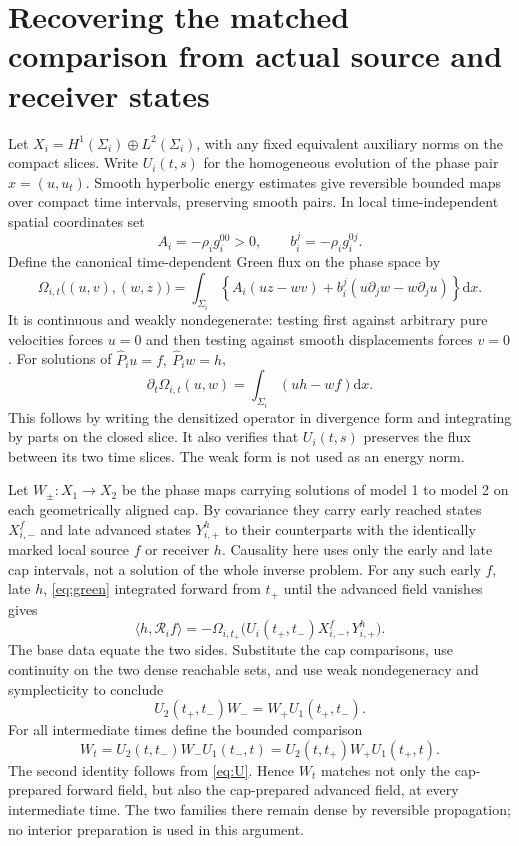\documentclass[11pt]{article}
\numberwithin{equation}{section}
\newcommand\dd{\mathrm d}
\newcommand\cR{\mathcal R}
\begin{document}
\section{Recovering the matched comparison from actual source and receiver states}

Let \(X_i=H^1(\Sigma_i)\oplus L^2(\Sigma_i)\), with any fixed equivalent auxiliary norms on the compact slices. Write \(U_i(t,s)\) for the homogeneous evolution of the phase pair \(x=(u,u_t)\). Smooth hyperbolic energy estimates give reversible bounded maps over compact time intervals, preserving smooth pairs. In local time-independent spatial coordinates set
\[
 A_i=-\rho_i g_i^{00}>0,\qquad b_i^j=-\rho_i g_i^{0j}.
\]
Define the canonical time-dependent Green flux on the phase space by
\begin{equation}\label{eq:omega}
 \Omega_{i,t}\big((u,v),(w,z)\big)
 =\int_{\Sigma_i}\left\{A_i(uz-wv)
          +b_i^j(u\partial_jw-w\partial_j u)\right\}\dd x .
\end{equation}
It is continuous and weakly nondegenerate: testing first against arbitrary pure velocities forces \(u=0\) and then testing against smooth displacements forces \(v=0\). For solutions of \(\widehat P_i u=f,\ \widehat P_i w=h\),
\begin{equation}\label{eq:green}
 \partial_t\Omega_{i,t}(u,w)=\int_{\Sigma_i}(u h-w f)\dd x .
\end{equation}
This follows by writing the densitized operator in divergence form and integrating by parts on the closed slice. It also verifies that \(U_i(t,s)\) preserves the flux between its two time slices. The weak form is not used as an energy norm.

Let \(W_\pm:X_1\to X_2\) be the phase maps carrying solutions of model 1 to model 2 on each geometrically aligned cap. By covariance they carry early reached states \(X_{i,-}^f\) and late advanced states \(Y_{i,+}^h\) to their counterparts with the identically marked local source \(f\) or receiver \(h\). Causality here uses only the early and late cap intervals, not a solution of the whole inverse problem. For any such early \(f\), late \(h\), \eqref{eq:green} integrated forward from \(t_+\) until the advanced field vanishes gives
\[
 \langle h,\cR_i f\rangle
 =-\Omega_{i,t_+}\big(U_i(t_+,t_-)X_{i,-}^f,Y_{i,+}^h\big).
\]
The base data equate the two sides. Substitute the cap comparisons, use continuity on the two dense reachable sets, and use weak nondegeneracy and symplecticity to conclude
\begin{equation}\label{eq:U}
 U_2(t_+,t_-)W_-=W_+U_1(t_+,t_-).
\end{equation}
For all intermediate times define the bounded comparison
\[
 W_t=U_2(t,t_-)W_-U_1(t_-,t)
     =U_2(t,t_+)W_+U_1(t_+,t).
\]
The second identity follows from \eqref{eq:U}. Hence \(W_t\) matches not only the cap-prepared forward field, but also the cap-prepared advanced field, at every intermediate time. The two families there remain dense by reversible propagation; no interior preparation is used in this argument.
\end{document}
